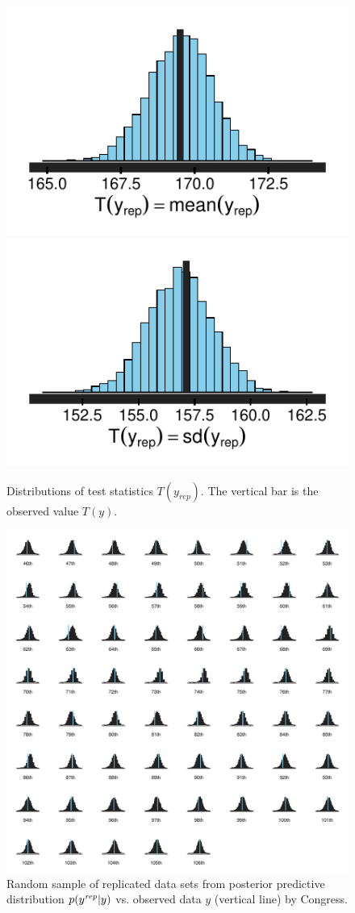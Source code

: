 \begin{figure}
\centering
	\includegraphics[scale=0.75]{sections/figs/test_stats_mean}
	\includegraphics[scale=0.75]{sections/figs/test_stats_sd}
\caption{Distributions of test statistics $T(y_{rep})$. The vertical bar is the observed value $T(y)$.}
\label{fig:ck_pp_test_statistics}
\end{figure}

\begin{figure}
\centering
	\includegraphics[scale=0.8]{sections/figs/ck_pp_nWins_hists}
\caption{Random sample of replicated data sets from posterior predictive distribution $p(y^{\it rep} | y)$ vs. observed data $y$ (vertical line) by Congress.}
\label{fig:ck_pp_nWins_hists}
\end{figure}



